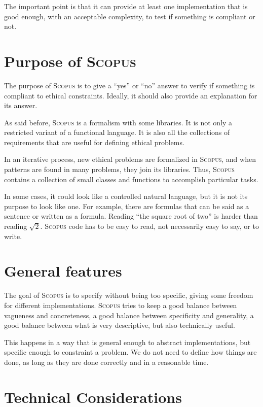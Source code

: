 \documentclass[12pt,a4paper]{book}
\newcommand{\Scopus}{\textsc{Scopus}\xspace}
\begin{document}
    The important point is that it can provide at least one implementation that is good enough, with an acceptable complexity, to test if something is compliant or not.


    \section{Purpose of \Scopus}

    The purpose of \Scopus is to give a ``yes'' or ``no'' answer to verify if something is compliant to ethical constraints.
    Ideally, it should also provide an explanation for its answer.

    As said before, \Scopus is a formalism with some libraries.
    It is not only a restricted variant of a functional language.
    It is also all the collections of requirements that are useful for defining ethical problems.

    In an iterative process, new ethical problems are formalized in \Scopus, and when patterns are found in many problems, they join its libraries.
    Thus, \Scopus contains a collection of small classes and functions to accomplish particular tasks.

    In some cases, it could look like a controlled natural language, but it is not its purpose to look like one.
    For example, there are formulas that can be said as a sentence or written as a formula.
    Reading ``the square root of two'' is harder than reading $\sqrt{2}$.
    \Scopus code has to be easy to read, not necessarily easy to say, or to write.


    \section{General features}

    The goal of \Scopus is to specify without being too specific, giving some freedom for different implementations.
    \Scopus tries to keep a good balance between vagueness and concreteness, a good balance between specificity and generality,
    a good balance between what is very descriptive, but also technically useful.

    This happens in a way that is general enough to abstract implementations, but specific enough to constraint a problem.
    We do not need to define how things are done, as long as they are done correctly and in a reasonable time.


    \section{Technical Considerations}
\end{document}

